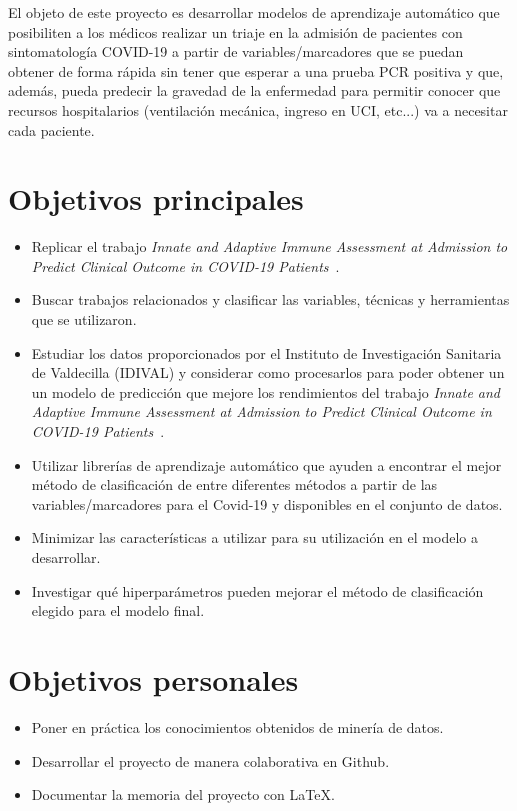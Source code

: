  \label{capi2}

El objeto de este proyecto es desarrollar modelos de aprendizaje automático que posibiliten a los médicos realizar un triaje en la admisión de pacientes con sintomatología COVID-19 a partir de variables/marcadores que se puedan obtener de forma rápida sin tener que esperar a una prueba PCR positiva y que, además, pueda predecir la gravedad de la enfermedad para permitir conocer que recursos hospitalarios (ventilación mecánica, ingreso en UCI, etc...) va a necesitar cada paciente.

\section{Objetivos principales}

\begin{itemize}
	\item Replicar el trabajo \textit{Innate and Adaptive Immune Assessment at Admission to Predict Clinical Outcome in COVID-19 Patients}~\cite{sansegundo:2021}.
    \item Buscar trabajos relacionados y clasificar las variables, técnicas y herramientas que se utilizaron.
	\item Estudiar los datos proporcionados por el Instituto de Investigación Sanitaria de Valdecilla (IDIVAL) y considerar como procesarlos para poder obtener un un modelo de predicción que mejore los rendimientos del trabajo \textit{Innate and Adaptive Immune Assessment at Admission to Predict Clinical Outcome in COVID-19 Patients}~\cite{sansegundo:2021}.
    \item Utilizar librerías de aprendizaje automático que ayuden a encontrar el mejor método de clasificación de entre diferentes métodos a partir de las variables/marcadores para el Covid-19 y disponibles en el conjunto de datos.
    \item Minimizar las características a utilizar para su utilización en el modelo a desarrollar.
    \item Investigar qué hiperparámetros pueden mejorar el método de clasificación elegido para el modelo final.
\end{itemize}

\section{Objetivos personales}

\begin{itemize}
    \item Poner en práctica los conocimientos obtenidos de minería de datos.
    \item Desarrollar el proyecto  de manera colaborativa en Github.
    \item Documentar la memoria del proyecto con \LaTeX.
\end{itemize}